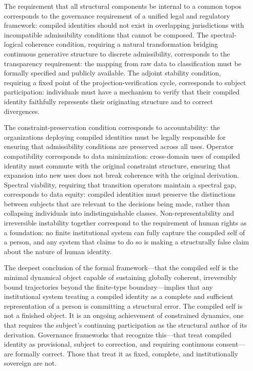 \documentclass[12pt, a4paper]{article}
\theoremstyle{plain}
\theoremstyle{definition}
\theoremstyle{remark}
\begin{document}
The requirement that all structural components be internal to a common topos corresponds to the governance requirement of a unified legal and regulatory framework: compiled identities should not exist in overlapping jurisdictions with incompatible admissibility conditions that cannot be composed. The spectral-logical coherence condition, requiring a natural transformation bridging continuous generative structure to discrete admissibility, corresponds to the transparency requirement: the mapping from raw data to classification must be formally specified and publicly available. The adjoint stability condition, requiring a fixed point of the projection-verification cycle, corresponds to subject participation: individuals must have a mechanism to verify that their compiled identity faithfully represents their originating structure and to correct divergences.

The constraint-preservation condition corresponds to accountability: the organizations deploying compiled identities must be legally responsible for ensuring that admissibility conditions are preserved across all uses. Operator compatibility corresponds to data minimization: cross-domain uses of compiled identity must commute with the original constraint structure, ensuring that expansion into new uses does not break coherence with the original derivation. Spectral viability, requiring that transition operators maintain a spectral gap, corresponds to data equity: compiled identities must preserve the distinctions between subjects that are relevant to the decisions being made, rather than collapsing individuals into indistinguishable classes. Non-representability and irreversible instability together correspond to the requirement of human rights as a foundation: no finite institutional system can fully capture the compiled self of a person, and any system that claims to do so is making a structurally false claim about the nature of human identity.

The deepest conclusion of the formal framework---that the compiled self is the minimal dynamical object capable of sustaining globally coherent, irreversibly bound trajectories beyond the finite-type boundary---implies that any institutional system treating a compiled identity as a complete and sufficient representation of a person is committing a structural error. The compiled self is not a finished object. It is an ongoing achievement of constrained dynamics, one that requires the subject's continuing participation as the structural author of its derivation. Governance frameworks that recognize this---that treat compiled identity as provisional, subject to correction, and requiring continuous consent---are formally correct. Those that treat it as fixed, complete, and institutionally sovereign are not.
\end{document}
